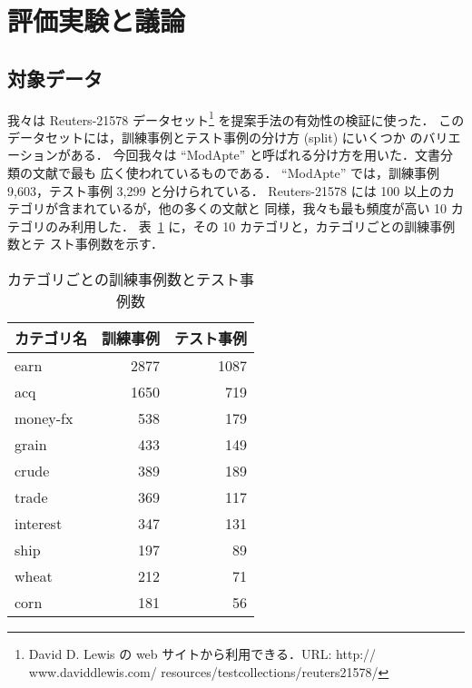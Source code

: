 \section{評価実験と議論}\label{sec:exp}
\subsection{対象データ}
我々は Reuters-21578 データセット\footnote{
David D. Lewis の web サイトから利用できる．URL: http:\slash\slash
www.daviddlewis.com\slash
resources\slash testcollections\slash reuters21578\slash
} を提案手法の有効性の検証に使った．
このデータセットには，訓練事例とテスト事例の分け方 (split) にいくつか
のバリエーションがある．
今回我々は ``ModApte'' と呼ばれる分け方を用いた．文書分類の文献で最も
広く使われているものである．
``ModApte'' では，訓練事例 9,603，テスト事例 3,299 と分けられている．
Reuters-21578 には 100 以上のカテゴリが含まれているが，他の多くの文献と
同様，我々も最も頻度が高い 10 カテゴリのみ利用した．
表~\ref{tbl:numcat} に，その 10 カテゴリと，カテゴリごとの訓練事例数とテ
スト事例数を示す．
\begin{table}
\caption{カテゴリごとの訓練事例数とテスト事例数} 
\begin{center}
\begin{tabular}{l|r|r} \hline\hline
カテゴリ名 & 訓練事例 & テスト事例 \\ \hline
earn & 2877 & 1087 \\
acq & 1650 & 719 \\
money-fx & 538 & 179 \\
grain & 433 & 149 \\
crude & 389 & 189 \\
trade & 369 & 117 \\
interest & 347 & 131 \\
ship & 197 & 89 \\
wheat & 212 & 71 \\
corn & 181 & 56  \\ 
\hline
\end{tabular}
\end{center}
\label{tbl:numcat}
\end{table}

